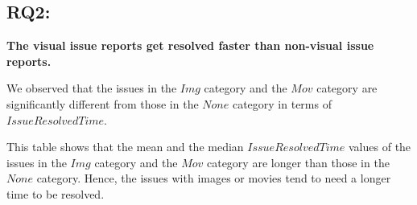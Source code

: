 {
}


\subsection{RQ2: \RQtwo{}}


\textbf{The visual issue reports get resolved faster than non-visual issue reports. }

We observed that the issues in the $Img$ category and 
the $Mov$ category are significantly different from those 
in the $None$ category in terms of $IssueResolvedTime$. 

This table shows that 
the mean and the median $IssueResolvedTime$ values of 
the issues in the $Img$ category and the $Mov$ category are 
longer than those in the $None$ category. 
Hence, the issues with images or movies tend to need 
a longer time to be resolved. 




{
}
